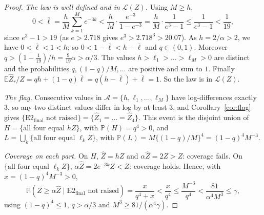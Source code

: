 \documentclass[11pt]{article}
\theoremstyle{remark}
\newcommand{\Zh}{\widehat Z}
\newcommand{\cL}{\mathcal{L}}
\newcommand{\Etwo}{\mathrm{E2}_{\mathrm{final}}}
\begin{document}
\begin{proof}
\emph{The law is well defined and in $\cL(Z)$.} Using $M\ge h$,
\[
0<\bar\ell=\frac hM\sum_{k=1}^Me^{-3k}<\frac hM\cdot\frac{e^{-3}}{1-e^{-3}}=\frac hM\cdot\frac1{e^3-1}\le\frac1{e^3-1}<\frac1{19},
\]
since $e^3-1>19$ (as $e>2.718$ gives $e^3>2.718^3>20.07$). As $h=2/\alpha>2$, we have $0<\bar\ell<1<h$; so $0<1-\bar\ell<h-\bar\ell$ and $q\in(0,1)$. Moreover
$q>(1-\tfrac1{19})/h=\tfrac{9}{19}\alpha>\alpha/3$. The values $h>\ell_1>\dots>\ell_M>0$ are distinct and the
probabilities $q,(1-q)/M,\dots$ are positive and sum to $1$. Finally
$\mathbb{E}\Zh_r/Z=qh+(1-q)\bar\ell=q(h-\bar\ell)+\bar\ell=1$. So the law is in $\cL(Z)$.

\emph{The flag.} Consecutive values in $\mathcal A=\{h,\ell_1,\dots,\ell_M\}$ have log-differences exactly $3$, so any two
distinct values differ in log by at least $3$, and Corollary~\ref{cor:flag} gives
$\{\Etwo\text{ not raised}\}=\{\Zh_1=\dots=\Zh_4\}$. This event is the disjoint union of $H=\{\text{all four equal }hZ\}$,
with $\mathbb{P}(H)=q^4>0$, and $L=\bigcup_k\{\text{all four equal }\ell_kZ\}$, with
$\mathbb{P}(L)=M\{(1-q)/M\}^4=(1-q)^4M^{-3}$.

\emph{Coverage on each part.} On $H$, $\Zh=hZ$ and $\alpha\Zh=2Z>Z$: coverage fails. On $\{\text{all four equal }
\ell_kZ\}$, $\alpha\Zh=2e^{-3k}Z<Z$: coverage holds. Hence, with $x=(1-q)^4M^{-3}>0$,
\[
\mathbb{P}(Z\ge\alpha\Zh\mid\Etwo\text{ not raised})=\frac{x}{q^4+x}<\frac{x}{q^4}\le\frac{M^{-3}}{q^4}
<\frac{81}{\alpha^4M^3}\le\gamma,
\]
using $(1-q)^4\le1$, $q>\alpha/3$ and $M^3\ge81/(\alpha^4\gamma)$.
\end{proof}
\end{document}
